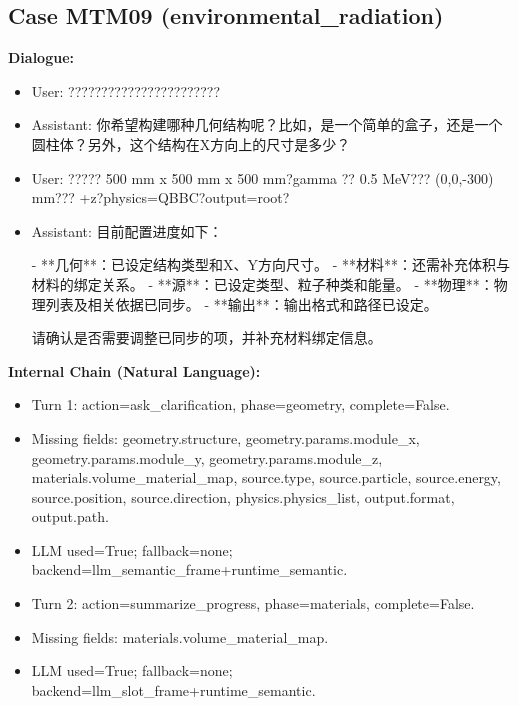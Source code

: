 \documentclass[11pt]{ctexart}
\begin{document}
\subsection{Case MTM09 (environmental\_radiation)}
\textbf{Dialogue:}
\begin{itemize}
\item User: ???????????????????????
\item Assistant: 你希望构建哪种几何结构呢？比如，是一个简单的盒子，还是一个圆柱体？另外，这个结构在X方向上的尺寸是多少？
\item User: ????? 500 mm x 500 mm x 500 mm?gamma ?? 0.5 MeV??? (0,0,-300) mm??? +z?physics=QBBC?output=root?
\item Assistant: 目前配置进度如下：

- **几何**：已设定结构类型和X、Y方向尺寸。
- **材料**：还需补充体积与材料的绑定关系。
- **源**：已设定类型、粒子种类和能量。
- **物理**：物理列表及相关依据已同步。
- **输出**：输出格式和路径已设定。

请确认是否需要调整已同步的项，并补充材料绑定信息。
\end{itemize}
\textbf{Internal Chain (Natural Language):}
\begin{itemize}
\item Turn 1: action=ask\_clarification, phase=geometry, complete=False.
\item Missing fields: geometry.structure, geometry.params.module\_x, geometry.params.module\_y, geometry.params.module\_z, materials.volume\_material\_map, source.type, source.particle, source.energy, source.position, source.direction, physics.physics\_list, output.format, output.path.
\item LLM used=True; fallback=none; backend=llm\_semantic\_frame+runtime\_semantic.
\item Turn 2: action=summarize\_progress, phase=materials, complete=False.
\item Missing fields: materials.volume\_material\_map.
\item LLM used=True; fallback=none; backend=llm\_slot\_frame+runtime\_semantic.
\end{itemize}
\end{document}
